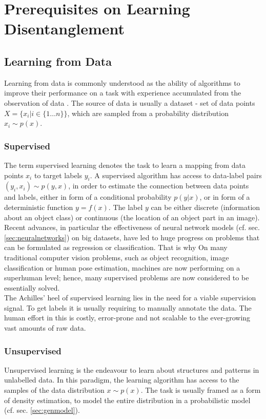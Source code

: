 \chapter{Prerequisites on Learning Disentanglement}

\section{Learning from Data}
	{Learning from data} is commonly understood as the ability of algorithms to improve their performance on a task with experience accumulated from the observation of data \cite{goodfellow16dlb}. The source of data is usually a dataset - set of data points $X = \{x_i | i \in \{1\ldots n\} \}$, which are sampled from a probability distribution $x_i \sim p(x)$.

	\subsection{Supervised}\label{sec:supervised}
		The term {supervised learning} denotes the task to learn a mapping from data points $x_i$ to target labels $y_i$.
		A supervised algorithm has access to data-label pairs  $(y_i, x_i) \sim p(y, x)$, in order to estimate the connection between data points and labels, either in form of a conditional probability $p(y|x)$, or in form of a deterministic function $y = f(x)$.
		The label $y$ can be either discrete (\eg information about an object class) or continuous (\eg the location of an object part in an image).
		Recent advances, in particular the effectiveness of neural network models (cf. sec. \ref{sec:neuralnetworks}) on big datasets, have led to huge progress on problems that can be formulated as regression or classification. That is why On many traditional computer vision problems, such as \eg object recognition, image classification or human pose estimation, machines are now performing on a superhuman level; hence, many supervised problems are now considered to be essentially solved.\\
		The Achilles' heel of supervised learning lies in the need for a viable supervision signal. To get labels it is usually requiring to manually annotate the data. The human effort in this is costly, error-prone and not scalable to the ever-growing vast amounts of raw data.

	\subsection{Unsupervised}\label{sec:unsupervised}
		{Unsupervised learning} is the endeavour to learn about structures and patterns in unlabelled data. In this paradigm, the learning algorithm has access to the samples of the data distribution $x \sim p(x)$. The task is usually framed as a form of density estimation, \ie to model the entire distribution in a probabilistic model (cf. sec. \ref{sec:genmodel}).

